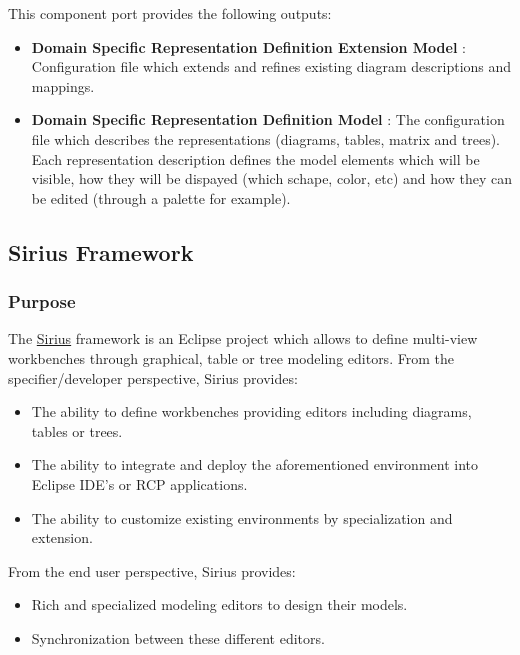 \documentclass{gemoc} %
\begin{document}
This component port provides the following outputs:
\begin{itemize}
  \item \textbf{Domain Specific Representation Definition Extension Model} :
Configuration file which extends and refines existing diagram descriptions and mappings.
  \item \textbf{Domain Specific  Representation Definition Model} :
The configuration file which describes the representations (diagrams, tables, matrix and trees). Each representation description defines the model elements which will be visible, how they will be dispayed (which schape, color, etc) and how they can be edited (through a palette for example).
\end{itemize}


\subsection{Sirius Framework}


\subsubsection{Purpose}
The \href{http://www.eclipse.org/proposals/modeling.sirius/}{Sirius} framework is an Eclipse project which allows to define multi-view workbenches through graphical, table or tree modeling editors.
From the specifier/developer perspective, Sirius provides:
\begin{itemize}
\item The ability to define workbenches providing editors including diagrams, tables or trees.
\item The ability to integrate and deploy the aforementioned environment into Eclipse IDE's or RCP applications.
\item The ability to customize existing environments by specialization and extension.
\end{itemize}
From the end user perspective, Sirius provides:
\begin{itemize}
\item Rich and specialized modeling editors to design their models.
\item Synchronization between these different editors.
\end{itemize}
\end{document}
